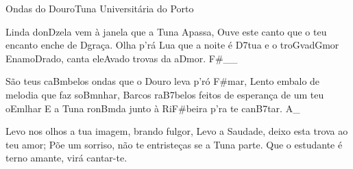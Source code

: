 \begin{musica}{Ondas do Douro}{Tuna Universitária do Porto}{}

Linda don\ac{D}{ze}la vem à janela que a Tuna \ac{A}{pa}ssa,
Ouve este canto que o teu encanto enche de \ac{D}{gra}ça.
Olha p’rá Lua que a noite é \ac{D7}{tua} e o tro\ac{G}{va}d\ac{Gm}{or}
Enamo\ac{D}{ra}do, canta ele\ac{A}{va}do trovas da a\ac{D}{mor}. \ac{F#}{}__

São teus ca\ac{Bm}{be}los ondas que o Douro leva p’ró \ac{F#}{mar},
Lento embalo de melodia que faz so\ac{Bm}{nhar},
Barcos ra\ac{B7}{be}los feitos de esperança de um teu o\ac{Em}{lhar}
E a Tuna ron\ac{Bm}{da} junto à Ri\ac{F#}{bei}ra p’ra te can\ac{B7}{tar}. \ac{A}{}_


Levo nos olhos a tua imagem, brando fulgor,
Levo a Saudade, deixo esta trova ao teu amor;
Põe um sorriso, não te entristeças se a Tuna parte.
Que o estudante é terno amante, virá cantar-te.

\end{musica}
